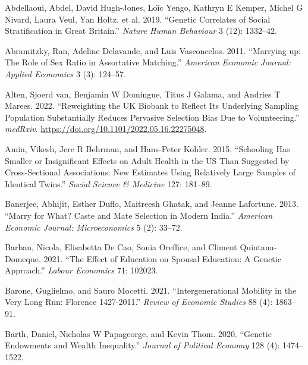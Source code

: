\documentclass[
]{article}
\newlength{\cslhangindent}
\newlength{\cslentryspacingunit} %
\newenvironment{CSLReferences}[2] %
 {%
  \setlength{\parindent}{0pt}
  \ifodd #1
  \let\oldpar\par
  \def\par{\hangindent=\cslhangindent\oldpar}
  \fi
  \setlength{\parskip}{#2\cslentryspacingunit}
 }%
 {}
\theoremstyle{definition}
\theoremstyle{definition}
\theoremstyle{definition}
\theoremstyle{definition}
\theoremstyle{remark}
\begin{document}
\hypertarget{refs}{}
\begin{CSLReferences}{1}{0}
\leavevmode{}%
Abdellaoui, Abdel, David Hugh-Jones, Loı̈c Yengo, Kathryn E Kemper, Michel G Nivard, Laura Veul, Yan Holtz, et al. 2019. {``Genetic Correlates of Social Stratification in Great Britain.''} \emph{Nature Human Behaviour} 3 (12): 1332--42.

\leavevmode{}%
Abramitzky, Ran, Adeline Delavande, and Luis Vasconcelos. 2011. {``Marrying up: The Role of Sex Ratio in Assortative Matching.''} \emph{American Economic Journal: Applied Economics} 3 (3): 124--57.

\leavevmode{}%
Alten, Sjoerd van, Benjamin W Domingue, Titus J Galama, and Andries T Marees. 2022. {``Reweighting the UK Biobank to Reflect Its Underlying Sampling Population Substantially Reduces Pervasive Selection Bias Due to Volunteering.''} \emph{medRxiv}. \url{https://doi.org/10.1101/2022.05.16.22275048}.

\leavevmode{}%
Amin, Vikesh, Jere R Behrman, and Hans-Peter Kohler. 2015. {``Schooling Has Smaller or Insignificant Effects on Adult Health in the US Than Suggested by Cross-Sectional Associations: New Estimates Using Relatively Large Samples of Identical Twins.''} \emph{Social Science \& Medicine} 127: 181--89.

\leavevmode{}%
Banerjee, Abhijit, Esther Duflo, Maitreesh Ghatak, and Jeanne Lafortune. 2013. {``Marry for What? Caste and Mate Selection in Modern India.''} \emph{American Economic Journal: Microeconomics} 5 (2): 33--72.

\leavevmode{}%
Barban, Nicola, Elisabetta De Cao, Sonia Oreffice, and Climent Quintana-Domeque. 2021. {``The Effect of Education on Spousal Education: A Genetic Approach.''} \emph{Labour Economics} 71: 102023.

\leavevmode{}%
Barone, Guglielmo, and Sauro Mocetti. 2021. {``Intergenerational Mobility in the Very Long Run: Florence 1427-2011.''} \emph{Review of Economic Studies} 88 (4): 1863--91.

\leavevmode{}%
Barth, Daniel, Nicholas W Papageorge, and Kevin Thom. 2020. {``Genetic Endowments and Wealth Inequality.''} \emph{Journal of Political Economy} 128 (4): 1474--1522.


\end{CSLReferences}
\end{document}
